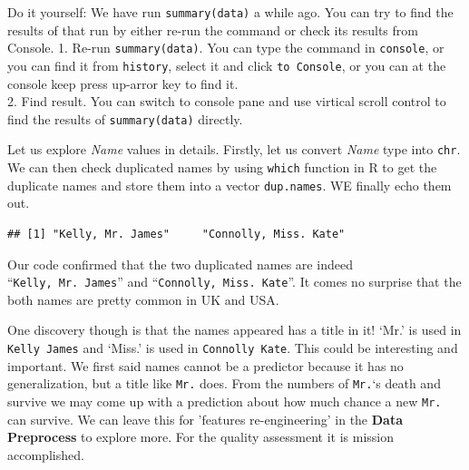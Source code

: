 \documentclass[
]{book}
\makeatletter
\newenvironment{Shaded}{\begin{snugshade}}{\end{snugshade}}
\newcommand{\CommentTok}[1]{\textcolor[rgb]{0.56,0.35,0.01}{\textit{#1}}}
\newcommand{\KeywordTok}[1]{\textcolor[rgb]{0.13,0.29,0.53}{\textbf{#1}}}
\newcommand{\NormalTok}[1]{#1}
\newcommand{\OperatorTok}[1]{\textcolor[rgb]{0.81,0.36,0.00}{\textbf{#1}}}
\newcommand{\StringTok}[1]{\textcolor[rgb]{0.31,0.60,0.02}{#1}}
\newenvironment{kframe}{%
\medskip{}
\setlength{\fboxsep}{.8em}
 \def\at@end@of@kframe{}%
 \ifinner\ifhmode%
  \def\at@end@of@kframe{\end{minipage}}%
  \begin{minipage}{\columnwidth}%
 \fi\fi%
 \def\FrameCommand##1{\hskip\@totalleftmargin \hskip-\fboxsep
 \colorbox{shadecolor}{##1}\hskip-\fboxsep
     \hskip-\linewidth \hskip-\@totalleftmargin \hskip\columnwidth}%
 \MakeFramed {\advance\hsize-\width
   \@totalleftmargin\z@ \linewidth\hsize
   \@setminipage}}%
 {\par\unskip\endMakeFramed%
 \at@end@of@kframe}
\newenvironment{rmdblock}[1]
  {
  \begin{itemize}
  \renewcommand{\labelitemi}{
    \raisebox{-.7\height}[0pt][0pt]{
      {\setkeys{Gin}{width=3em,keepaspectratio}\texttt{[image: images/\#1]}}
    }
  }
  \setlength{\fboxsep}{1em}
  \begin{kframe}
  \item
  }
  {
  \end{kframe}
  \end{itemize}
  }
\newenvironment{rmdaction}
  {\begin{rmdblock}{action}}
  {\end{rmdblock}}
\makeatother
\begin{document}
\begin{rmdaction}
Do it yourself:
We have run \texttt{summary(data)} a while ago. You can try to find the results of that run by either re-run the command or check its results from Console.
1. Re-run \texttt{summary(data)}. You can type the command in \texttt{console}, or you can find it from \texttt{history}, select it and click \texttt{to\ Console}, or you can at the console keep press up-arror key to find it.\\
2. Find result. You can switch to console pane and use virtical scroll control to find the results of \texttt{summary(data)} directly.
\end{rmdaction}

Let us explore \emph{Name} values in details. Firstly, let us convert \emph{Name} type into \texttt{chr}. We can then check duplicated names by using \texttt{which} function in R to get the duplicate names and store them into a vector \texttt{dup.names}. WE finally echo them out.

\begin{Shaded}
\end{Shaded}

\begin{verbatim}
## [1] "Kelly, Mr. James"     "Connolly, Miss. Kate"
\end{verbatim}

Our code confirmed that the two duplicated names are indeed ``\texttt{Kelly,\ Mr.\ James}'' and ``\texttt{Connolly,\ Miss.\ Kate}''. It comes no surprise that the both names are pretty common in UK and USA.

One discovery though is that the names appeared has a title in it! `Mr.' is used in \texttt{Kelly\ James} and `Miss.' is used in \texttt{Connolly\ Kate}. This could be interesting and important. We first said names cannot be a predictor because it has no generalization, but a title like \texttt{Mr.} does. From the numbers of \texttt{Mr.}`s death and survive we may come up with a prediction about how much chance a new \texttt{Mr.} can survive. We can leave this for 'features re-engineering' in the \textbf{Data Preprocess} to explore more. For the quality assessment it is mission accomplished.
\end{document}

